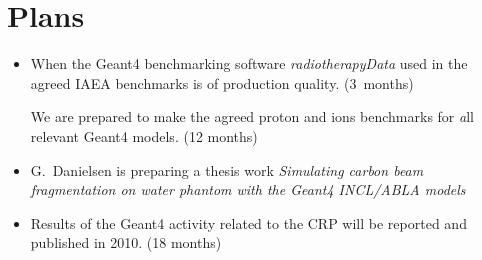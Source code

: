 \documentclass[twoside,floatfix,a4wide]{d}
\numberwithin{equation}{section} %
\begin{document}

\section{Plans}
\vspace{-0.4cm}
\begin{itemize}
\item  When the Geant4 benchmarking software {\em radiotherapyData} used in 
the agreed IAEA benchmarks is of production quality. (3~months)
\begin{itemize}
We are prepared to make the agreed proton and ions 
benchmarks for {\emph all} relevant Geant4 models. (12 months)

\end{itemize}
\item G.~Danielsen is preparing a thesis work 
{\em Simulating carbon beam fragmentation on water phantom with the Geant4 INCL/ABLA models}
\item Results of the Geant4 activity related to the CRP will be reported and published in 2010. (18 months)
\end{itemize}


%  
\end{document}
